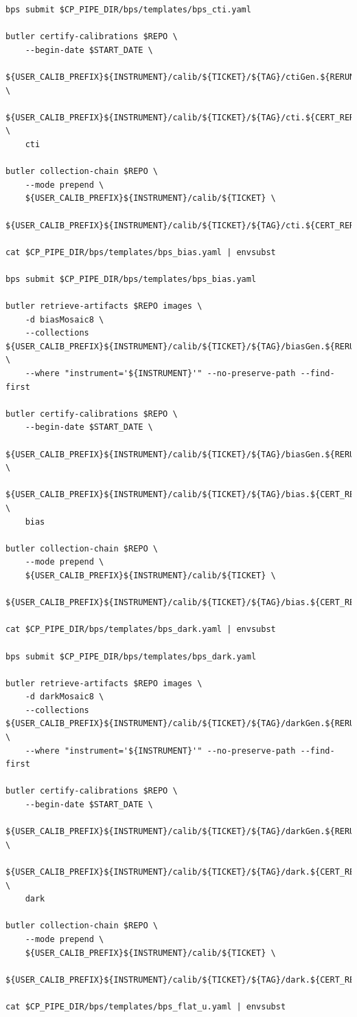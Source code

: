 \documentclass[DM,authoryear,toc]{lsstdoc}
\begin{document}
\begin{footnotesize}
\begin{verbatim}
bps submit $CP_PIPE_DIR/bps/templates/bps_cti.yaml

butler certify-calibrations $REPO \
    --begin-date $START_DATE \
    ${USER_CALIB_PREFIX}${INSTRUMENT}/calib/${TICKET}/${TAG}/ctiGen.${RERUN} \
    ${USER_CALIB_PREFIX}${INSTRUMENT}/calib/${TICKET}/${TAG}/cti.${CERT_RERUN} \
    cti

butler collection-chain $REPO \
    --mode prepend \
    ${USER_CALIB_PREFIX}${INSTRUMENT}/calib/${TICKET} \
    ${USER_CALIB_PREFIX}${INSTRUMENT}/calib/${TICKET}/${TAG}/cti.${CERT_RERUN}

cat $CP_PIPE_DIR/bps/templates/bps_bias.yaml | envsubst

bps submit $CP_PIPE_DIR/bps/templates/bps_bias.yaml

butler retrieve-artifacts $REPO images \
    -d biasMosaic8 \
    --collections ${USER_CALIB_PREFIX}${INSTRUMENT}/calib/${TICKET}/${TAG}/biasGen.${RERUN} \
    --where "instrument='${INSTRUMENT}'" --no-preserve-path --find-first

butler certify-calibrations $REPO \
    --begin-date $START_DATE \
    ${USER_CALIB_PREFIX}${INSTRUMENT}/calib/${TICKET}/${TAG}/biasGen.${RERUN} \
    ${USER_CALIB_PREFIX}${INSTRUMENT}/calib/${TICKET}/${TAG}/bias.${CERT_RERUN} \
    bias

butler collection-chain $REPO \
    --mode prepend \
    ${USER_CALIB_PREFIX}${INSTRUMENT}/calib/${TICKET} \
    ${USER_CALIB_PREFIX}${INSTRUMENT}/calib/${TICKET}/${TAG}/bias.${CERT_RERUN}

cat $CP_PIPE_DIR/bps/templates/bps_dark.yaml | envsubst

bps submit $CP_PIPE_DIR/bps/templates/bps_dark.yaml

butler retrieve-artifacts $REPO images \
    -d darkMosaic8 \
    --collections ${USER_CALIB_PREFIX}${INSTRUMENT}/calib/${TICKET}/${TAG}/darkGen.${RERUN} \
    --where "instrument='${INSTRUMENT}'" --no-preserve-path --find-first

butler certify-calibrations $REPO \
    --begin-date $START_DATE \
    ${USER_CALIB_PREFIX}${INSTRUMENT}/calib/${TICKET}/${TAG}/darkGen.${RERUN} \
    ${USER_CALIB_PREFIX}${INSTRUMENT}/calib/${TICKET}/${TAG}/dark.${CERT_RERUN} \
    dark

butler collection-chain $REPO \
    --mode prepend \
    ${USER_CALIB_PREFIX}${INSTRUMENT}/calib/${TICKET} \
    ${USER_CALIB_PREFIX}${INSTRUMENT}/calib/${TICKET}/${TAG}/dark.${CERT_RERUN}

cat $CP_PIPE_DIR/bps/templates/bps_flat_u.yaml | envsubst


\end{verbatim}
\end{footnotesize}
\end{document}
